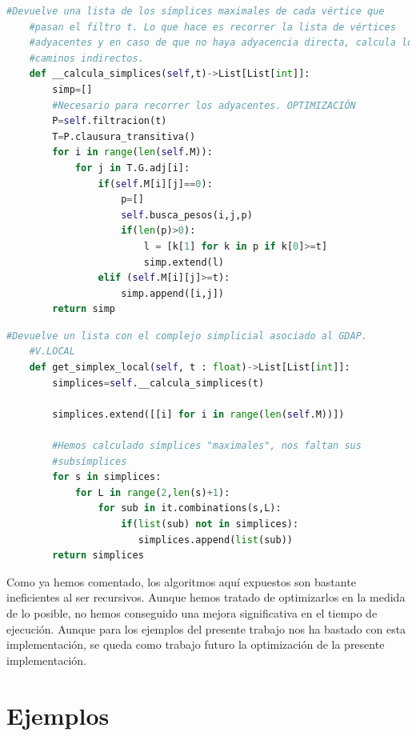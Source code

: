 \documentclass[12pt, a4paper, twoside]{book}
\numberwithin{equation}{section}
\theoremstyle{definition}
\theoremstyle{remark}
\theoremstyle{plain}
\begin{document}
	\begin{lstlisting}[language=Python, float=htbp, caption=Función para 
	el cálculo de símplices maximales (local)., label=cod:DefSML]
	#Devuelve una lista de los símplices maximales de cada vértice que 
	#pasan el filtro t. Lo que hace es recorrer la lista de vértices 
	#adyacentes y en caso de que no haya adyacencia directa, calcula los 
	#caminos indirectos.
	def __calcula_simplices(self,t)->List[List[int]]:
        simp=[]
        #Necesario para recorrer los adyacentes. OPTIMIZACIÓN
        P=self.filtracion(t)
        T=P.clausura_transitiva()
        for i in range(len(self.M)):
            for j in T.G.adj[i]:
                if(self.M[i][j]==0):
                    p=[]
                    self.busca_pesos(i,j,p)
                    if(len(p)>0):
                        l = [k[1] for k in p if k[0]>=t]
                        simp.extend(l)
                elif (self.M[i][j]>=t):
                    simp.append([i,j])
        return simp
	\end{lstlisting}

	\begin{lstlisting}[language=Python,float=htbp, caption= Función para 
	el cálculo de todos los símplices (local)., label=cod:DefSL]
	#Devuelve un lista con el complejo simplicial asociado al GDAP. 
	#V.LOCAL
	def get_simplex_local(self, t : float)->List[List[int]]:
        simplices=self.__calcula_simplices(t)
        
        simplices.extend([[i] for i in range(len(self.M))])
        
        #Hemos calculado símplices "maximales", nos faltan sus 
        #subsímplices
        for s in simplices:
            for L in range(2,len(s)+1):
                for sub in it.combinations(s,L):
                    if(list(sub) not in simplices):
                       simplices.append(list(sub))
        return simplices
	\end{lstlisting}

	Como ya hemos comentado, los algoritmos aquí expuestos son bastante 
	ineficientes al ser recursivos. Aunque hemos tratado de optimizarlos 
	en la medida de lo posible, no hemos conseguido una mejora 
	significativa en el tiempo de ejecución. Aunque para los ejemplos del 
	presente trabajo nos ha bastado con esta implementación, se queda como
	trabajo futuro la optimización de la presente implementación.
	
	\section{Ejemplos}
	
\end{document}
